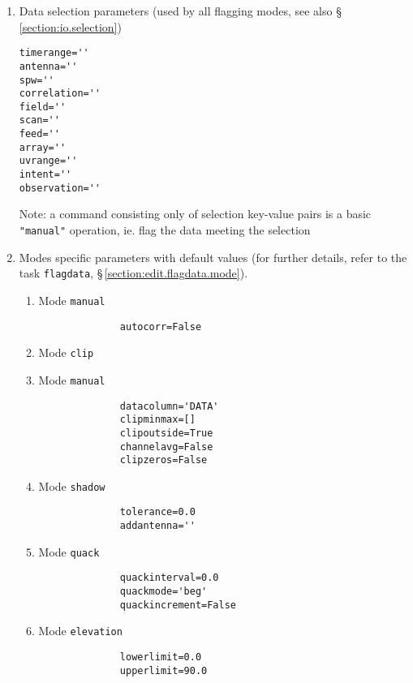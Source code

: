 \begin{enumerate}
        
\item Data selection parameters (used by all flagging modes, see also \S\,\ref{section:io.selection}) 

\small
\begin{verbatim}        
timerange='' 
antenna='' 
spw='' 
correlation='' 
field='' 
scan='' 
feed=''
array='' 
uvrange='' 
intent='' 
observation=''
\end{verbatim}
\normalsize
        

Note: a command consisting only of selection key-value pairs is a
basic {\tt "manual"} operation, ie. flag the data meeting the selection
          
        
\item Modes specific parameters with default values (for further details,
refer to the task {\tt flagdata}, \S\,\ref{section:edit.flagdata.mode}).
     
\begin{enumerate}
     
\item Mode {\tt manual}
\small
\begin{verbatim}
              autocorr=False
\end{verbatim}
\normalsize

\item Mode {\tt clip}
     
\item Mode {\tt manual}
\small
\begin{verbatim}
              datacolumn='DATA'
              clipminmax=[]  
              clipoutside=True
              channelavg=False  
              clipzeros=False
\end{verbatim}
\normalsize             

\item Mode {\tt shadow}
\small
\begin{verbatim}
              tolerance=0.0
              addantenna=''
\end{verbatim}
\normalsize  

\item Mode {\tt quack}
\small
\begin{verbatim}
              quackinterval=0.0     
              quackmode='beg' 
              quackincrement=False
\end{verbatim}
\normalsize  
              
\item Mode {\tt elevation}
\small
\begin{verbatim}
              lowerlimit=0.0
              upperlimit=90.0
\end{verbatim}
\normalsize  
              

\end{enumerate}
\end{enumerate}
